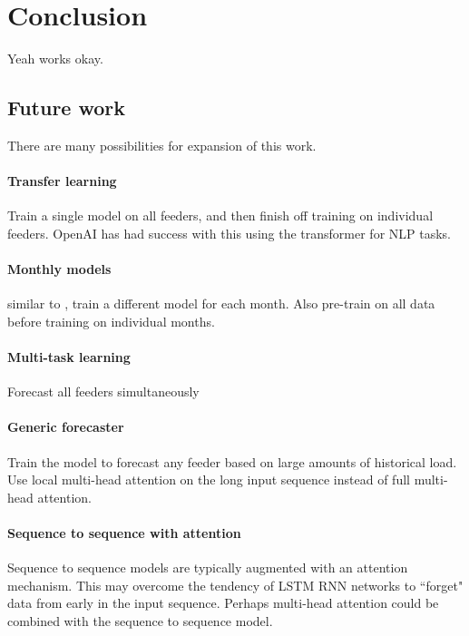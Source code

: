 \chapter{Conclusion}
Yeah works okay.

\section{Future work}
There are many possibilities for expansion of this work.

\subsubsection{Transfer learning}
Train a single model on all feeders, and then finish off training on individual feeders.
OpenAI has had success with this using the transformer for NLP tasks.

\subsubsection{Monthly models}
similar to \citet{Ceperic2013}, train a different model for each month.
Also pre-train on all data before training on individual months.

\subsubsection{Multi-task learning}
Forecast all feeders simultaneously

\subsubsection{Generic forecaster}
Train the model to forecast any feeder based on large amounts of historical load.
Use local multi-head attention on the long input sequence instead of full multi-head attention.

\subsubsection{Sequence to sequence with attention}
Sequence to sequence models are typically augmented with an attention mechanism.
This may overcome the tendency of LSTM RNN networks to ``forget" data from early in the input sequence.
Perhaps multi-head attention could be combined with the sequence to sequence model.